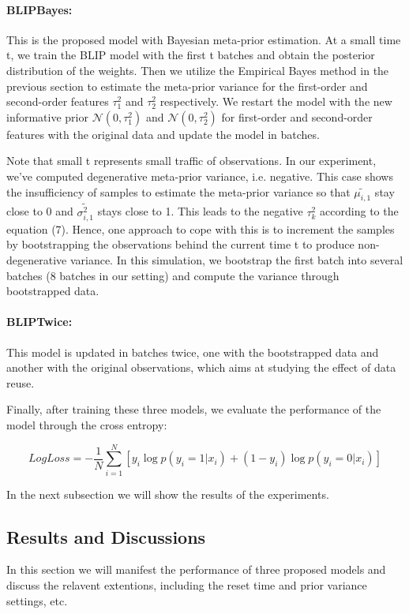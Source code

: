 \documentclass{article}
\begin{document}
\paragraph*{BLIPBayes:}

This is the proposed model with Bayesian meta-prior estimation. At a small time t, we train the BLIP model with the first t batches and obtain the posterior distribution of the weights. Then we utilize the Empirical Bayes method in the previous section to estimate the meta-prior variance for the first-order and second-order features $\tau_1^2$ and $\tau_2^2$ respectively. We restart the model with the new informative prior $\mathcal{N}(0,\tau_1^2)$ and $\mathcal{N}(0,\tau_2^2)$ for first-order and second-order features with the original data and update the model in batches.

Note that small t represents small traffic of observations. In our experiment, we've computed degenerative meta-prior variance, i.e. negative. This case shows the insufficiency of samples to estimate the meta-prior variance so that $\tilde{\mu_{i,1}}$ stay close to 0 and $\tilde{\sigma_{i,1}^2}$ stays close to 1. This leads to the negative $\tau_k^2$ according to the equation (7). Hence, one approach to cope with this is to increment the samples by bootstrapping the observations behind the current time t to produce non-degenerative variance. In this simulation, we bootstrap the first batch into several batches (8 batches in our setting) and compute the variance through bootstrapped data. 

\paragraph*{BLIPTwice:}

This model is updated in batches twice, one with the bootstrapped data and another with the original observations, which aims at studying the effect of data reuse.

Finally, after training these three models, we evaluate the performance of the model through the cross entropy:

\begin{equation}
  LogLoss = - \frac{1}{N} \sum_{i=1}^N \left[ y_i \log p(y_i=1|x_i) + (1-y_i) \log p(y_i=0|x_i) \right]
\end{equation}

In the next subsection we will show the results of the experiments.

\subsection{Results and Discussions}
In this section we will manifest the performance of three proposed models and discuss the relavent extentions, including the reset time and prior variance settings, etc. 
\end{document}
